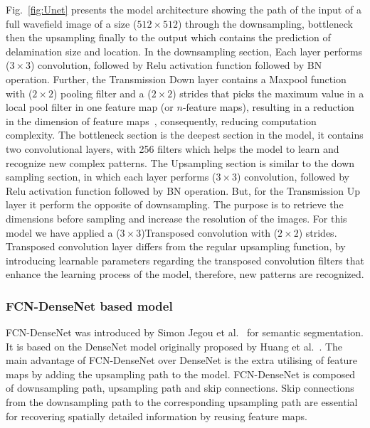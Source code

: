 	Fig.~\ref{fig:Unet} presents the model architecture showing the path of the input of a full wavefield image of a size (\(512\times512\)) through the downsampling, bottleneck then the upsampling finally to the output which contains the prediction of delamination size and location. 
	In the downsampling section,
	Each layer performs (\(3\times3\)) convolution, followed by Relu activation function followed by BN operation.
	Further, the Transmission Down layer contains a Maxpool function with (\(2\times2\)) pooling filter and a (\(2\times2\)) strides that picks the maximum value in a local pool filter in one feature map (or \(n\)-feature maps), resulting in a reduction in the dimension of feature maps~\cite{Lecun2015}, consequently, reducing computation complexity.
	The bottleneck section is the deepest section in the model, it contains two convolutional layers, with 256 filters which helps the model to learn and recognize new complex patterns.
	The Upsampling section is similar to the down sampling section, in which each layer  performs (\(3\times3\)) convolution, followed by Relu activation function followed by BN operation. But, for the Transmission Up layer it perform the opposite of downsampling.
	The purpose is to retrieve the dimensions before sampling and increase the resolution of the images. 
	For this model we have applied a (\(3\times3\))Transposed convolution with (\(2\times2\)) strides.
	Transposed convolution layer differs from the regular upsampling function, by introducing learnable parameters regarding the transposed convolution filters that enhance the learning process of the model, therefore, new patterns are recognized. 
	\subsubsection{FCN-DenseNet based model}
	FCN-DenseNet was introduced by Simon Jegou et al.~\cite{Jegou} for semantic segmentation.
	It is based on the DenseNet model originally proposed by Huang et al.~\cite{Huang}. 
	The main advantage of FCN-DenseNet over DenseNet is the extra utilising of feature maps by adding the upsampling path to the model.
	FCN-DenseNet is composed of downsampling path, upsampling path and skip connections.
	Skip connections from the downsampling path to the corresponding upsampling path are essential for recovering spatially detailed information by reusing feature maps.
 
